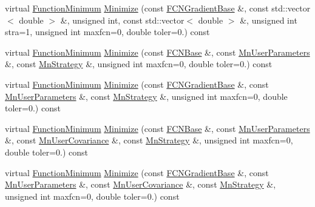 \begin{DoxyCompactItemize}
\item 
virtual \mbox{\hyperlink{classROOT_1_1Minuit2_1_1FunctionMinimum}{Function\+Minimum}} \mbox{\hyperlink{classROOT_1_1Minuit2_1_1ModularFunctionMinimizer_a97334cf66537c195aa8d6df14e745bef}{Minimize}} (const \mbox{\hyperlink{classROOT_1_1Minuit2_1_1FCNGradientBase}{F\+C\+N\+Gradient\+Base}} \&, const std\+::vector$<$ double $>$ \&, unsigned int, const std\+::vector$<$ double $>$ \&, unsigned int stra=1, unsigned int maxfcn=0, double toler=0.) const
\item 
virtual \mbox{\hyperlink{classROOT_1_1Minuit2_1_1FunctionMinimum}{Function\+Minimum}} \mbox{\hyperlink{classROOT_1_1Minuit2_1_1ModularFunctionMinimizer_a194ce8da431014aa6a2b45ede2a53391}{Minimize}} (const \mbox{\hyperlink{classROOT_1_1Minuit2_1_1FCNBase}{F\+C\+N\+Base}} \&, const \mbox{\hyperlink{classROOT_1_1Minuit2_1_1MnUserParameters}{Mn\+User\+Parameters}} \&, const \mbox{\hyperlink{classROOT_1_1Minuit2_1_1MnStrategy}{Mn\+Strategy}} \&, unsigned int maxfcn=0, double toler=0.) const
\item 
virtual \mbox{\hyperlink{classROOT_1_1Minuit2_1_1FunctionMinimum}{Function\+Minimum}} \mbox{\hyperlink{classROOT_1_1Minuit2_1_1ModularFunctionMinimizer_a71fd7fab341881d9d082d4d2d5f5ed2d}{Minimize}} (const \mbox{\hyperlink{classROOT_1_1Minuit2_1_1FCNGradientBase}{F\+C\+N\+Gradient\+Base}} \&, const \mbox{\hyperlink{classROOT_1_1Minuit2_1_1MnUserParameters}{Mn\+User\+Parameters}} \&, const \mbox{\hyperlink{classROOT_1_1Minuit2_1_1MnStrategy}{Mn\+Strategy}} \&, unsigned int maxfcn=0, double toler=0.) const
\item 
virtual \mbox{\hyperlink{classROOT_1_1Minuit2_1_1FunctionMinimum}{Function\+Minimum}} \mbox{\hyperlink{classROOT_1_1Minuit2_1_1ModularFunctionMinimizer_acb99ccb1a23b88947ee5996c03c584ff}{Minimize}} (const \mbox{\hyperlink{classROOT_1_1Minuit2_1_1FCNBase}{F\+C\+N\+Base}} \&, const \mbox{\hyperlink{classROOT_1_1Minuit2_1_1MnUserParameters}{Mn\+User\+Parameters}} \&, const \mbox{\hyperlink{classROOT_1_1Minuit2_1_1MnUserCovariance}{Mn\+User\+Covariance}} \&, const \mbox{\hyperlink{classROOT_1_1Minuit2_1_1MnStrategy}{Mn\+Strategy}} \&, unsigned int maxfcn=0, double toler=0.) const
\item 
virtual \mbox{\hyperlink{classROOT_1_1Minuit2_1_1FunctionMinimum}{Function\+Minimum}} \mbox{\hyperlink{classROOT_1_1Minuit2_1_1ModularFunctionMinimizer_a79a1879062ddd4959716be08c519954e}{Minimize}} (const \mbox{\hyperlink{classROOT_1_1Minuit2_1_1FCNGradientBase}{F\+C\+N\+Gradient\+Base}} \&, const \mbox{\hyperlink{classROOT_1_1Minuit2_1_1MnUserParameters}{Mn\+User\+Parameters}} \&, const \mbox{\hyperlink{classROOT_1_1Minuit2_1_1MnUserCovariance}{Mn\+User\+Covariance}} \&, const \mbox{\hyperlink{classROOT_1_1Minuit2_1_1MnStrategy}{Mn\+Strategy}} \&, unsigned int maxfcn=0, double toler=0.) const

\end{DoxyCompactItemize}
